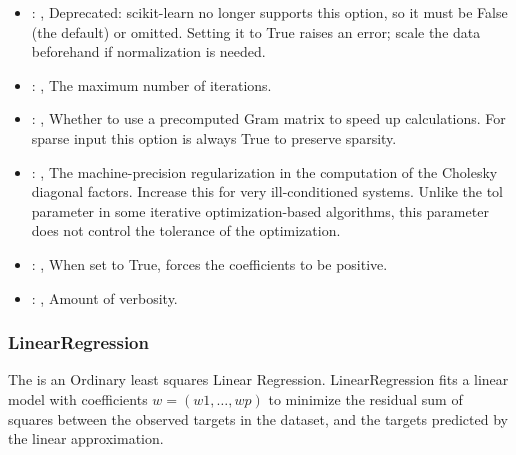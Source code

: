 \begin{itemize}
    \item {}: ,
      Deprecated: scikit-learn no longer supports this option, so it must be False (the default) or
      omitted.                                                  Setting it to True raises an error;
      scale the data beforehand if normalization is needed.

    \item {}: ,
      The maximum number of iterations.

    \item {}: ,
      Whether to use a precomputed Gram matrix to speed up calculations.
      For sparse input this option is always True to preserve sparsity.

    \item {}: ,
      The machine-precision regularization in the computation of the Cholesky
      diagonal factors. Increase this for very ill-conditioned systems. Unlike the tol
      parameter in some iterative optimization-based algorithms, this parameter does not
      control the tolerance of the optimization.

    \item {}: ,
      When set to True, forces the coefficients to be positive.

    \item {}: ,
      Amount of verbosity.
  \end{itemize}


\subsubsection{LinearRegression}
  The                          is an Ordinary least squares Linear
  Regression.                         LinearRegression fits a linear model with coefficients $w =
  (w1, …, wp)$ to                         minimize the residual sum of squares between the observed
  targets in the                         dataset, and the targets predicted by the linear
  approximation.                         

